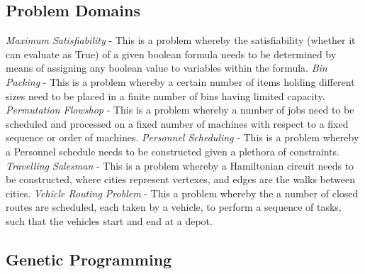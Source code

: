 \documentclass[a4paper,12pt]{article}
\begin{document}
        \subsection{Problem Domains}
            \par{
                \noindent  
                \textit{Maximum Satisfiability} -
                This is a problem whereby the satisfiability (whether it can evaluate as True)
                of a given boolean formula needs to be determined by means of assigning any
                boolean value to variables within the formula.\newline 
                \newline 
                \textit{Bin Packing} -
                This is a problem whereby a certain number of items holding different sizes need
                to be placed in a finite number of bins having limited capacity.\newline 
                \newline
                \textit{Permutation Flowshop} - 
                This is a problem whereby a number of jobs need to be scheduled and processed
                on a fixed number of machines with respect to a fixed sequence or order of
                machines.\newline 
                \newline
                \textit{Personnel Scheduling} - 
                This is a problem whereby a Personnel schedule needs to be constructed given
                a plethora of constraints.\newline 
                \newline
                \textit{Travelling Salesman} - 
                This is a problem whereby a Hamiltonian circuit needs to be constructed, where
                cities represent vertexes, and edges are the walks between cities.\newline 
                \newline
                \textit{Vehicle Routing Problem} -
                This a problem whereby the a number of closed routes are scheduled, each taken
                by a vehicle, to perform a sequence of tasks, such that the vehicles start and
                end at a depot.
            }
            \subsection{Genetic Programming}
\end{document}

